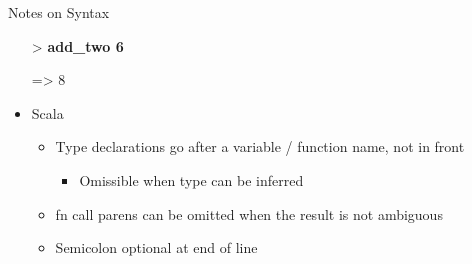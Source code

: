 \documentclass{beamer}
\begin{document}
\begin{frame}[allowframebreaks]{Notes on Syntax}
\begin{itemize}
{\ttfamily\color{black}
\textcolor[rgb]{0.0,0.0,0.8039216}{{\textgreater} }\textbf{add\_two 6}}

{\ttfamily\color{black}
={\textgreater} 8}
  \item Scala
    \begin{itemize}
    \item Type declarations go after a variable / function name, not
      in front
      \begin{itemize}
      \item Omissible when type can be inferred
      \end{itemize}
    \item fn call parens can be omitted when the result is not
      ambiguous
    \item Semicolon optional at end of line
    \end{itemize}
{\ttfamily\color{black}}
  \end{itemize}
\end{frame}
\end{document}
